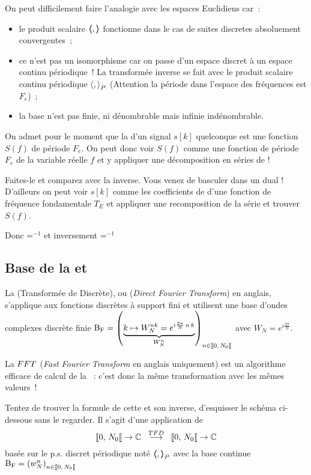 On peut difficilement faire l'analogie avec les espaces Euclidiens  car~:
\begin{itemize}
   \item le produit scalaire $\langle\!\!\langle,\rangle\!\!\rangle$ fonctionne dans le cas de suites discretes absoluement convergentes~;
 \item ce n'est pas un isomorphisme car on passe d'un espace discret à un espace continu périodique~! La transformée inverse se fait avec le produit scalaire continu périodique $\langle,{\rangle}_P$ (Attention la période dans l'espace des fréquences est $F_e$)~;
\item la base n'est pas finie, ni dénombrable  mais infinie indénombrable.
\end{itemize}


\begin{exercice}
  On admet pour le moment que la \TFSD{} d'un signal $s[k]$ quelconque est une fonction $S(f)$ de période $F_e$. On peut donc voir $S(f)$ comme une fonction de période $F_e$ de la variable réelle $f$ et y appliquer une décomposition en séries de \Fourier{}!

  Faites-le et comparez avec la \TFSD{} inverse. Vous venez de basculer dans un dual ! D'ailleurs on peut voir $s[k]$ comme les coefficients de \Fourier{} d'une fonction de fréquence fondamentale $T_E$ et appliquer une recomposition de la série et trouver $S(f)$.

  Donc \TFSD{}=\sdf{}$^{-1}$ et inversement \sdf{}=\TFSD{}$^{-1}$
\end{exercice}

\subsection{Base de la \TFD{} et  \FFT{}}

La \TFD{} (Transformée de \Fourier{} Discrète), ou \DFT{} (\emph{Direct Fourier Transform}) en anglais, s'applique aux fonctions discrètes à support fini et utilisent une base d'ondes complexes discrète finie $\Bf=\p{\caCest{k\mapsto W_N^{nk}=e^{i \frac{2 \pi}{N}\,n\,k}}{W_N^{n}}}_{n\in\SN0}$ avec $W_N=e^{i \frac{2 \pi}{N}}$.

La $FFT{}$ (\emph{Fast Fourier Transform} en anglais uniquement) est un algorithme efficace de calcul de la \TFD{}~: c'est donc la même transformation avec les mêmes valeurs~!

\begin{exercice}
Tentez de trouver la formule de cette \TFD{}  et son inverse, d'esquisser le schéma ci-dessous sans le regarder. Il s'agit d'une application de $$\SN0\rightarrow\C\;\;\operateur{\TFD}\;\;\SN0\rightarrow\C$$ basée sur le p.s. discret périodique noté $\langle\!\!\langle,{\rangle\!\!\rangle}_P$ avec la base continue $\Bf=\p{w_N^{n}}_{n\in\SN0}$
\end{exercice}

